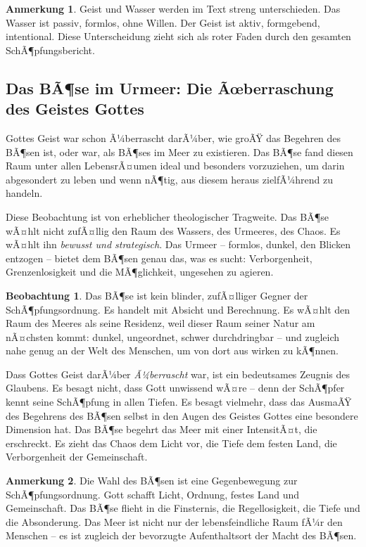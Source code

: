 ﻿\documentclass[a4paper,12pt]{article}
\theoremstyle{definition}
\newtheorem{remark}{Anmerkung}[section]
\newtheorem{observation}{Beobachtung}[section]
\begin{document}
\begin{remark}
    Geist und Wasser werden im Text streng unterschieden. Das Wasser ist passiv,
    formlos, ohne Willen. Der Geist ist aktiv, form\-gebend, intentional. Diese
    Unterscheidung zieht sich als roter Faden durch den gesamten SchÃ¶pfungsbericht.
\end{remark}

\subsection{Das BÃ¶se im Urmeer: Die Ãœberraschung des Geistes Gottes}

Gottes Geist war schon Ã¼berrascht darÃ¼ber, wie groÃŸ das Begehren des BÃ¶sen ist,
oder war, als BÃ¶ses im Meer zu existieren. Das BÃ¶se fand diesen Raum unter allen
LebensrÃ¤umen ideal und besonders vorzuziehen, um darin abgesondert zu leben und
wenn nÃ¶tig, aus diesem heraus zielfÃ¼hrend zu handeln.

Diese Beobachtung ist von erheblicher theologischer Tragweite. Das BÃ¶se wÃ¤hlt
nicht zufÃ¤llig den Raum des Wassers, des Urmeeres, des Chaos. Es wÃ¤hlt ihn
\textit{bewusst und strategisch}. Das Urmeer -- formlos, dunkel, den Blicken
entzogen -- bietet dem BÃ¶sen genau das, was es sucht: Verborgenheit,
Grenzenlosigkeit und die MÃ¶glichkeit, ungesehen zu agieren.

\begin{observation}
    Das BÃ¶se ist kein blinder, zufÃ¤lliger Gegner der SchÃ¶pfungsordnung. Es handelt
    mit Absicht und Berechnung. Es wÃ¤hlt den Raum des Meeres als seine Residenz,
    weil dieser Raum seiner Natur am nÃ¤chsten kommt: dunkel, ungeordnet, schwer
    durchdringbar -- und zugleich nahe genug an der Welt des Menschen, um von dort
    aus wirken zu kÃ¶nnen.
\end{observation}

Dass Gottes Geist darÃ¼ber \textit{Ã¼berrascht} war, ist ein bedeutsames Zeugnis
des Glaubens. Es besagt nicht, dass Gott unwissend wÃ¤re -- denn der SchÃ¶pfer kennt
seine SchÃ¶pfung in allen Tiefen. Es besagt vielmehr, dass das AusmaÃŸ des Begehrens
des BÃ¶sen selbst in den Augen des Geistes Gottes eine besondere Dimension hat.
Das BÃ¶se begehrt das Meer mit einer IntensitÃ¤t, die erschreckt. Es zieht das Chaos
dem Licht vor, die Tiefe dem festen Land, die Verborgenheit der Gemeinschaft.

\begin{remark}
    Die Wahl des BÃ¶sen ist eine Gegenbewegung zur SchÃ¶pfungsordnung. Gott schafft
    Licht, Ordnung, festes Land und Gemeinschaft. Das BÃ¶se flieht in die Finsternis,
    die Regellosigkeit, die Tiefe und die Absonderung. Das Meer ist nicht nur der
    lebensfeindliche Raum fÃ¼r den Menschen -- es ist zugleich der bevorzugte
    Aufenthaltsort der Macht des BÃ¶sen.
\end{remark}
\end{document}
